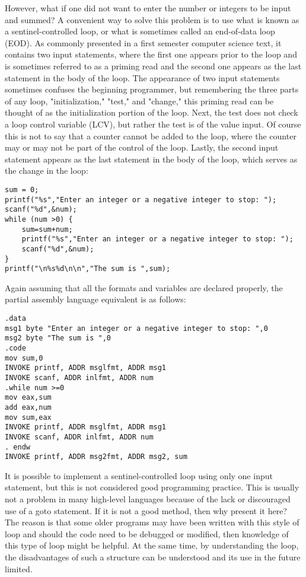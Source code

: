 \documentclass[10pt]{article}
\begin{document}
However, what if one did not want to enter the number or integers to be input and summed? A convenient way to solve this problem is to use what is known as a sentinel-controlled loop, or what is sometimes called an end-of-data loop (EOD). As commonly presented in a first semester computer science text, it contains two input statements, where the first one appears prior to the loop and is sometimes referred to as a priming read and the second one appears as the last statement in the body of the loop. The appearance of two input statements sometimes confuses the beginning programmer, but remembering the three parts of any loop, "initialization," "test," and "change," this priming read can be thought of as the initialization portion of the loop. Next, the test does not check a loop control variable (LCV), but rather the test is of the value input. Of course this is not to say that a counter cannot be added to the loop, where the counter may or may not be part of the control of the loop. Lastly, the second input statement appears as the last statement in the body of the loop, which serves as the change in the loop:

\begin{verbatim}
sum = 0;
printf("%s","Enter an integer or a negative integer to stop: ");
scanf("%d",&num);
while (num >0) {
    sum=sum+num;
    printf("%s","Enter an integer or a negative integer to stop: ");
    scanf("%d",&num);
}
printf("\n%s%d\n\n","The sum is ",sum);
\end{verbatim}

Again assuming that all the formats and variables are declared properly, the partial assembly language equivalent is as follows:

\begin{verbatim}
.data
msg1 byte "Enter an integer or a negative integer to stop: ",0
msg2 byte "The sum is ",0
.code
mov sum,0
INVOKE printf, ADDR msglfmt, ADDR msg1
INVOKE scanf, ADDR inlfmt, ADDR num
.while num >=0
mov eax,sum
add eax,num
mov sum,eax
INVOKE printf, ADDR msglfmt, ADDR msg1
INVOKE scanf, ADDR inlfmt, ADDR num
. endw
INVOKE printf, ADDR msg2fmt, ADDR msg2, sum
\end{verbatim}

It is possible to implement a sentinel-controlled loop using only one input statement, but this is not considered good programming practice. This is usually not a problem in many high-level languages because of the lack or discouraged use of a goto statement. If it is not a good method, then why present it here? The reason is that some older programs may have been written with this style of loop and should the code need to be debugged or modified, then knowledge of this type of loop might be helpful. At the same time, by understanding the loop, the disadvantages of such a structure can be understood and its use in the future limited.
\end{document}
